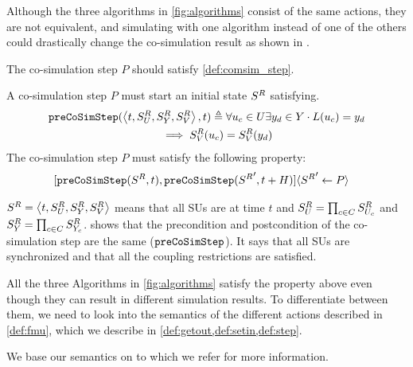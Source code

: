 Although the three algorithms in \cref{fig:algorithms} consist of the same actions, they are not equivalent, and simulating with one algorithm instead of one of the others could drastically change the co-simulation result as shown in \cite{Gomes2019c,hansen_verification_2021}. 

The co-simulation step $P$ should satisfy \cref{def:comsim_step}.

\begin{definition}\label{def:comsim_step}
  A co-simulation step $P$ must start an initial state $S^{R}_{}$ satisfying.
  \begin{align}
    &\mathtt{preCoSimStep}( \left\langle t,S^{R}_{U}, S^{R}_{Y},S^{R}_{V} \right\rangle , t) \triangleq 
    \forall u_{c} \in U
    \exists y_{d} \in Y
    \cdot L(u_{c}) = y_{d}  \nonumber \\
    &\qquad \qquad \qquad \qquad \qquad \implies
    S^{R}_{V}(u_{c}) = S^{R}_{V}(y_{d})
  \end{align}
  The co-simulation step $P$ must satisfy the following property: 
  \begin{align}
    &[\mathtt{preCoSimStep}(S^{R}_{}, t), 
    \mathtt{preCoSimStep}({S^{R}_{}}', t+H)] 
    \langle {S^{R}_{}}' \gets P\rangle
  \end{align}
\end{definition}

$S^{R}_{} =  \left\langle t, S^{R}_{U}, S^{R}_{Y}, S^{R}_{V} \right\rangle $ means that all SUs are at time $t$ and $S^{R}_{U} = \prod_{c \in C}S^{R}_{U_{c}}$ and $S^{R}_{Y} = \prod_{c \in C}S^{R}_{Y_{c}}$.
 shows that the precondition and postcondition of the co-simulation step are the same ($\mathtt{preCoSimStep}$).
It says that all SUs are synchronized and that all the coupling restrictions are satisfied.

All the three Algorithms in \cref{fig:algorithms} satisfy the property above even though they can result in different simulation results.
To differentiate between them, we need to look into the semantics of the different actions described in \cref{def:fmu}, which we describe in \cref{def:getout,def:setin,def:step}.

We base our semantics on \cite{Gomes2019a,hansen_verification_2021} to which we refer for more information.

